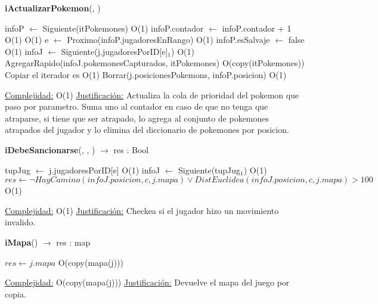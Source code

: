 \begin{algorithm}[H]{\textbf{iActualizarPokemon}(, )} 
	\begin{algorithmic}
		\State infoP $\gets$ Siguiente(itPokemones)	\Comment O(1)
		\State infoP.contador $\gets$ infoP.contador + 1	\Comment O(1)
    	\Comment O(1)
			\State e $\gets$ Proximo(infoP.jugadoresEnRango)	\Comment O(1)
			\State infoP.esSalvaje $\gets$ false	\Comment O(1)
			\State infoJ $\gets$ Siguiente(j.jugadoresPorID[e]$_{1}$)	\Comment O(1)
			\State AgregarRapido(infoJ.pokemonesCapturados, itPokemones)	\Comment O(copy(itPokemones)) {Copiar el iterador es O(1)}
			\State Borrar(j.posicionesPokemons, infoP.posicion) \Comment O(1)
		\EndIf

	
		\medskip
		\Statex \underline{Complejidad:} O(1)
		\Statex \underline{Justificación:} Actualiza la cola de prioridad del pokemon que paso por parametro. Suma uno al contador en caso de que no tenga que atraparse, si tiene que ser atrapado, lo agrega al conjunto de pokemones atrapados del jugador y lo elimina del diccionario de pokemones por posicion.
    \end{algorithmic}
\end{algorithm}

\begin{algorithm}[H]{\textbf{iDebeSancionarse}(, , ) $\to$ res : Bool} 
	\begin{algorithmic}
    \State tupJug $\gets$ j.jugadoresPorID[e]	\Comment O(1)
  	\State infoJ $\gets$ Siguiente(tupJug$_{1}$)	\Comment O(1)
		\State $res \gets \neg HayCamino(infoJ.posicion, c, j.mapa) \lor DistEuclidea(infoJ.posicion, c, j.mapa) > 100 $ \Comment O(1)
	
		\medskip
		\Statex \underline{Complejidad:} O(1)
		\Statex \underline{Justificación:} Checkea si el jugador hizo un movimiento invalido.
    \end{algorithmic}
\end{algorithm}

\begin{algorithm}[H]{\textbf{iMapa}() $\to$ res : map} 
	{}
	\begin{algorithmic}
		\State $res \gets j.mapa $ \Comment O(copy(mapa(j)))
	
		\medskip
		\Statex \underline{Complejidad:} O(copy(mapa(j)))
		\Statex \underline{Justificación:} Devuelve el mapa del juego por copia.
    \end{algorithmic}
\end{algorithm}

